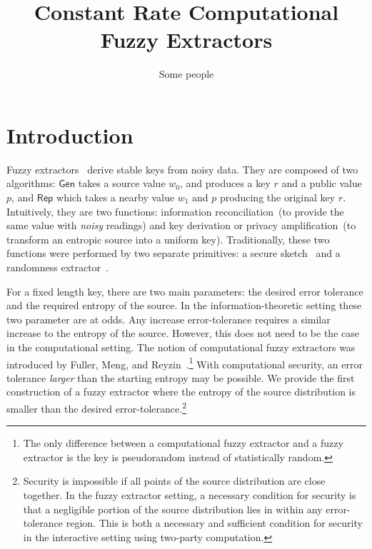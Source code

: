 \documentclass[11pt]{article}
\title{Constant Rate Computational Fuzzy Extractors}
\author{Some people}
\newcommand{\class}[1]{{\ensuremath{\mathsf{#1}}}}
\newcommand{\gen}{\ensuremath{\class{Gen}}\xspace}
\newcommand{\rep}{\ensuremath{\class{Rep}}\xspace}
\begin{document}
\maketitle




\section{Introduction}\label{sec:introduction}
Fuzzy extractors~\cite{DBLP:journals/siamcomp/DodisORS08} derive stable keys from noisy data.  They are composed of two algorithms: \gen takes a source value $w_0$, and produces a key $r$ and a public value $p$, and \rep which takes a nearby value $w_1$ and $p$ producing the original key $r$.  Intuitively, they are two functions: information reconciliation~(to provide the same value with \emph{noisy} readings) and key derivation or privacy amplification~(to transform an entropic source into a uniform key).  Traditionally, these two functions were performed by two separate primitives: a secure sketch~\cite{DBLP:journals/siamcomp/DodisORS08} and a randomness extractor~\cite{nisan1993randomness}.

For a fixed length key, there are two main parameters: the desired error tolerance and the required entropy of the source.  In the information-theoretic setting these two parameter are at odds.  Any increase error-tolerance requires a similar increase to the entropy of the source.  However, this does not need to be the case in the computational setting.  The notion of computational fuzzy extractors was introduced by Fuller, Meng, and Reyzin~\cite{fuller2013computational}.\footnote{The only difference between a computational fuzzy extractor and a fuzzy extractor is the key is pseudorandom instead of statistically random. }  With computational security, an error tolerance \emph{larger} than the starting entropy may be possible.  We provide the first construction of a fuzzy extractor where the entropy of the source distribution is smaller than the desired error-tolerance.\footnote{Security is impossible if all points of the source distribution are close together.  In the fuzzy extractor setting, a necessary condition for security is that a negligible portion of the source distribution lies in within any error-tolerance region.   This is both a necessary and sufficient condition for security in the interactive setting using two-party computation.}
\end{document}
